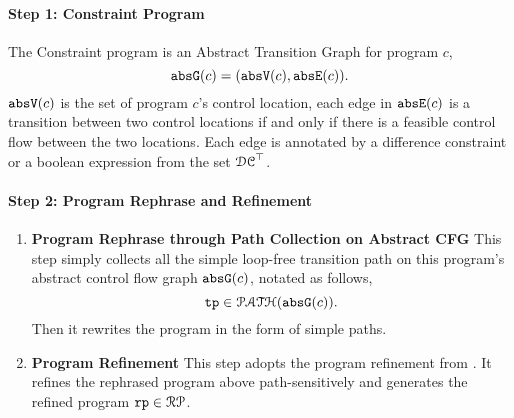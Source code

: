 \paragraph{Step 1: Constraint Program}
\label{sec:abs_prog}
The Constraint program is an Abstract Transition Graph for program $c$,
\[\mathtt{abs}{\mathtt{G}}(c) =(\mathtt{abs}{\mathtt{V}}(c), \mathtt{abs}{\mathtt{E}}(c)).\]
%
$\mathtt{abs}{\mathtt{V}}(c)$ is the set of program $c$'s control location, each edge in $\mathtt{abs}{\mathtt{E}}(c)$ is a transition
between two control locations if and only if there is a feasible control flow between the two locations.
Each edge is annotated by a difference constraint \cite{sinn2017complexity} or a boolean expression
from the set $\mathcal{DC}^{\top}$.
\paragraph{Step 2: Program Rephrase and Refinement}
\begin{enumerate}
  \item \textbf{ Program Rephrase through Path Collection on Abstract CFG}
  This step simply collects all the simple loop-free transition path
  on this program's abstract control flow graph $\mathtt{abs}{\mathtt{G}}(c)$, notated as follows,
  \[ \mathtt{tp} \in \mathcal{PATH}(\mathtt{abs}{\mathtt{G}}(c)). \]
  Then it rewrites the program in the form of simple paths.
  \item \textbf{ Program Refinement} This step adopts the program refinement from \cite{GulwaniJK09}.
  It refines the rephrased program above path-sensitively and generates the refined program 
  $\mathtt{rp} \in \mathcal{RP}$.
  \end{enumerate}
